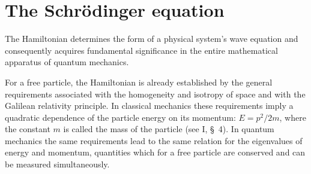 \section{The Schrödinger equation}

The Hamiltonian determines the form of a physical system's wave equation and
consequently acquires fundamental significance in the entire mathematical
apparatus of quantum mechanics.

For a free particle, the Hamiltonian is already established by the general
requirements associated with the homogeneity and isotropy of space and with
the Galilean relativity principle. In classical mechanics these requirements
imply a quadratic dependence of the particle energy on its
momentum: $E=p^2/2m$, where the constant $m$ is called the mass of the particle
(see I, \S~4). In quantum mechanics the same requirements lead to the same
relation for the eigenvalues of energy and momentum, quantities which for a
free particle are conserved and can be measured simultaneously.

